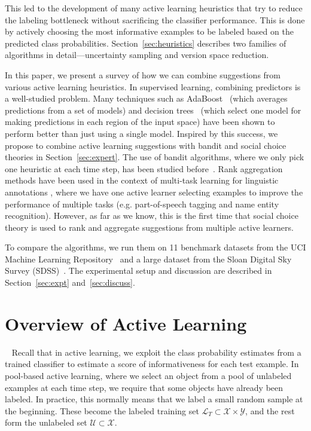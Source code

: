 \documentclass[fleqn,10pt,lineno]{wlpeerj} %
\newcommand{\X}{\mathcal{X}}
\newcommand{\Y}{\mathcal{Y}}
\newcommand{\Unlabeled}{\mathcal{U}}
\newcommand{\Labeled}{\mathcal{L}}
\begin{document}
This led to the development of many active learning heuristics that try to
reduce the labeling bottleneck without sacrificing the classifier performance.
This is done by actively choosing the most informative examples to be labeled
based on the predicted class probabilities. Section~\ref{sec:heuristics}
describes two families of algorithms in detail---uncertainty sampling and
version space reduction.

In this paper, we present a survey of how we can combine suggestions from
various active learning heuristics. In supervised learning, combining
predictors is a well-studied problem. Many techniques such as
AdaBoost~\citep{freund96} (which averages predictions from a set of models) and
decision trees~\citep{breiman84} (which select one model for making predictions
in each region of the input space) have been shown to perform better than just
using a single model. Inspired by this success, we propose to combine active
learning suggestions with bandit and social choice theories in
Section~\ref{sec:expert}. The use of bandit algorithms, where we only pick one
heuristic at each time step, has been studied before~\citep{baram04, hsu15}.
Rank aggregation methods have been used in the context of multi-task learning
for linguistic annotations \citep{reichart08}, where we have one active learner
selecting examples to improve the performance of multiple tasks (e.g.
part-of-speech tagging and name entity recognition). However, as far as we
know, this is the first time that social choice theory is used to rank and
aggregate suggestions from multiple active learners.

To compare the algorithms, we run them on 11 benchmark datasets from the UCI
Machine Learning Repository~\citep{lichman13} and a large dataset from the
Sloan Digital Sky Survey (SDSS)~\citep{alam15}. The experimental setup and
discussion are described in Section~\ref{sec:expt} and~\ref{sec:discuss}.


\section{Overview of Active Learning}~\label{sec:heuristics}
Recall that in active learning, we exploit the class probability estimates from
a trained classifier to estimate a score of informativeness for each test
example. In pool-based active learning, where we select an object from a pool
of unlabeled examples at each time step, we require that some objects have
already been labeled. In practice, this normally means that we label a small
random sample at the beginning. These become the labeled training set
$\Labeled_T \subset \X \times \Y$, and the rest form the unlabeled set
$\Unlabeled \subset \X$.
\end{document}
